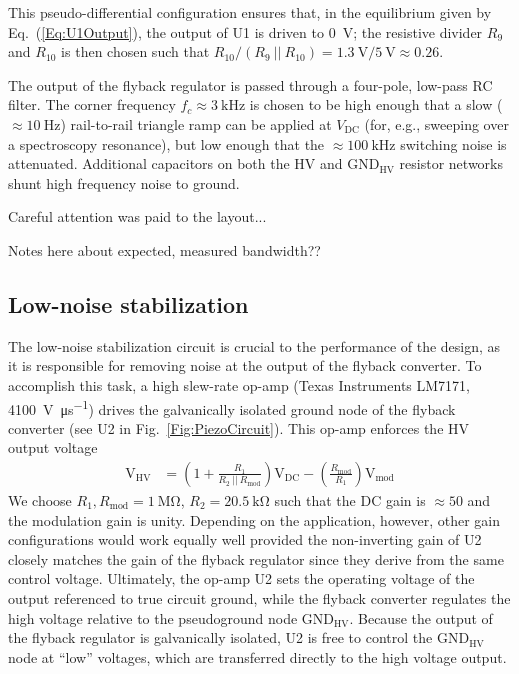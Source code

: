 \documentclass[aip,rsi,reprint]{revtex4-1} %
\begin{document}
This pseudo-differential configuration ensures that, in the equilibrium given by Eq.~(\ref{Eq:U1Output}), the output of U1 is driven to \SI{0}{\volt}; the resistive divider $R_9$ and $R_{10}$ is then chosen such that $R_{10}/(R_9~||~R_{10}) = \SI{1.3}{\volt}/\SI{5}{\volt} \approx \num{0.26}$.

The output of the flyback regulator is passed through a four-pole, low-pass RC filter.
The corner frequency $f_c \approx \SI{3}{\kilo\hertz}$ is chosen to be high enough that a slow ($\approx \SI{10}{\hertz}$) rail-to-rail triangle ramp can be applied at $V_\text{DC}$ (for, e.g., sweeping over a spectroscopy resonance), but low enough that the $\approx \SI{100}{\kilo\hertz}$ switching noise is attenuated.
Additional capacitors on both the HV and $\text{GND}_{\text{HV}}$ resistor networks shunt high frequency noise to ground.

Careful attention was paid to the layout...

Notes here about expected, measured bandwidth??


\subsection{Low-noise stabilization}
\label{Sec:LowNoiseStabilization}

The low-noise stabilization circuit is crucial to the performance of the design, as it is responsible for removing noise at the output of the flyback converter.
To accomplish this task, a high slew-rate op-amp (Texas Instruments LM7171, \SI[per-mode=symbol]{4100}{\volt\per\micro\second}) drives the galvanically isolated ground node of the flyback converter (see U2 in Fig.~\ref{Fig:PiezoCircuit}).
This op-amp enforces the HV output voltage
\begin{align}
\text{V}_\text{HV} &= \left(1 + \frac{R_1}{R_2~||~R_\text{mod}}\right) \text{V}_\text{DC} -
\left(\frac{R_\text{mod}}{R_1}\right) \text{V}_\text{mod}
\end{align}
We choose $R_1, R_\text{mod} = \SI{1}{\mega\ohm}$, $R_2 = \SI{20.5}{\kilo\ohm}$ such that the DC gain is $\approx 50$ and the modulation gain is unity.
Depending on the application, however, other gain configurations would work equally well provided the non-inverting gain of U2 closely matches the gain of the flyback regulator since they derive from the same control voltage.
Ultimately, the op-amp U2 sets the operating voltage of the output referenced to true circuit ground, while the flyback converter regulates the high voltage relative to the pseudoground node $\text{GND}_\text{HV}$.
Because the output of the flyback regulator is galvanically isolated, U2 is free to control the $\text{GND}_\text{HV}$ node at ``low'' voltages, which are transferred directly to the high voltage output.
\end{document}
